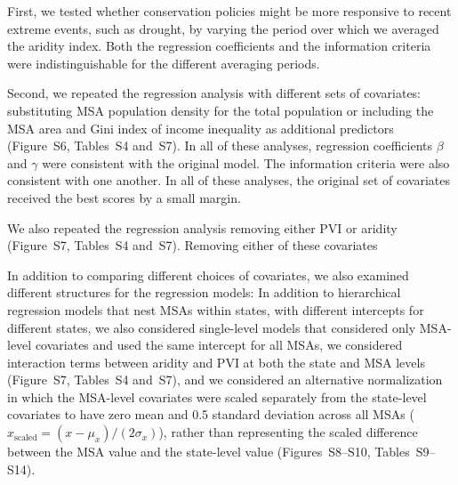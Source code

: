 \documentclass[draft,linenumbers]{agujournal}\usepackage{knitr}
\begin{document}
First, we tested whether conservation policies might be more
responsive to recent extreme events, such as drought, by varying the
period over which we averaged the aridity index.
Both the regression coefficients and the information criteria were
indistinguishable for the different averaging periods.

Second, we repeated the regression analysis
with different sets of covariates:
substituting MSA population density
for the total population or
including the MSA area and Gini index of income inequality as additional
predictors (Figure~S6, Tables~S4 and~S7).
In all of these analyses, regression coefficients $\beta$ and $\gamma$
were consistent with the original model.
The information criteria were also consistent with one another.
In all of these analyses, the original set of covariates received the best
scores by a small%
margin.

We also repeated the regression analysis removing either PVI or aridity
(Figure~S7, Tables~S4 and~S7).
Removing either of these covariates
%

In addition to comparing different choices of covariates, we also
examined different structures for the regression models:
In addition to hierarchical regression models that nest MSAs within states,
with different intercepts for different states, we also
considered single-level models that considered only MSA-level covariates and
used the same intercept for all MSAs,
we considered interaction terms between aridity and PVI at both
the state and MSA levels (Figure~S7, Tables~S4 and~S7),
and we considered an alternative normalization
in which the MSA-level covariates were scaled separately
from the state-level covariates to have zero mean and 0.5 standard deviation
across all MSAs ($x_{\text{scaled}} = (x - \mu_x) / (2 \sigma_x)$),
rather than representing
the scaled difference between the MSA value and the state-level value
(Figures~S8--S10, Tables~S9--S14).
\end{document}
